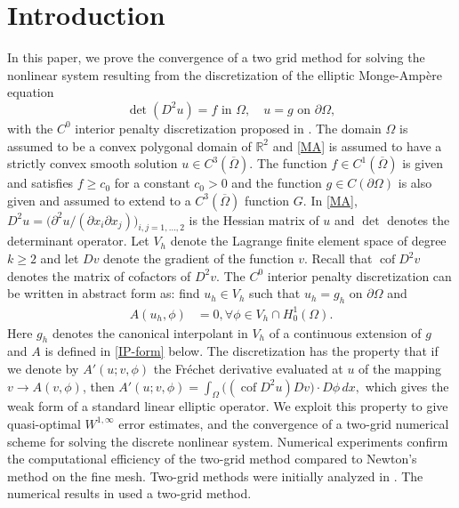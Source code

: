 \documentclass[12pt]{amsart}
\numberwithin{equation}{section}
\newcommand{\ud}{\,d}
\newcommand{\R}{\mathbb{R}}
\newcommand\cof{\operatorname{cof}}
\newcommand{\tir}[1]{\ensuremath{\overline {#1}}}
\begin{document}
\section{Introduction}
In this paper, we prove the convergence of a two grid method for solving the nonlinear system resulting from the discretization of the elliptic  Monge-Amp\`ere equation 
\begin{equation}
\det (D^2 u) = f \text{ in } \Omega, \quad u=g \text{ on } \partial \Omega,
\label{MA}
\end{equation}
with the  $C^0$ interior penalty discretization proposed in \cite{Brenner2010b}. The domain $\Omega$ is assumed to be a convex polygonal domain of $\R^2$ and \eqref{MA} is assumed to have a strictly convex smooth solution $u \in C^3(\tir{\Omega})$. The function $f \in C^1(\tir{\Omega})$ is given and satisfies $f \geq c_0$ for a constant $c_0 >0$  and the function $g\in C(\partial \Omega)$ is also given and
assumed to extend to a $C^3(\tir{\Omega})$ function $G$. In \eqref{MA}, $D^2 u=\big( \partial^2 u/(\partial x_i \partial x_j)\big)_{i,j=1,\ldots, 2} $ is the Hessian matrix of $u$ and $\det$ denotes the determinant operator. Let $V_h$ denote the Lagrange finite element space of degree $k \geq 2$ and let $D v$ denote the gradient of the function $v$. Recall that $\cof D^2 v$ denotes the matrix of cofactors of $D^2 v$. The $C^0$ interior penalty discretization can be written in abstract form as: find $u_h \in V_h$ such that $u_h=g_h$ on $\partial \Omega$ and
\begin{align} \label{IP-abstract}
A(u_h,\phi) & = 0, \forall \phi \in V_h \cap H_0^1(\Omega).
\end{align}
Here $g_h$ denotes the canonical interpolant in $V_h$ of a continuous extension of $g$  and $A$ is defined in \eqref{IP-form} below. The discretization has the property that if we denote by $A'(u;v, \phi)$ the Fr\'echet derivative evaluated at $u$ of the mapping $v \to A(v,\phi)$, then 
$A'(u;v,\phi)= \int_{\Omega} \big( (\cof  D^2 u) D v \big) \cdot D \phi \ud x,$ which gives the weak form of a standard linear elliptic operator. We exploit this property to give quasi-optimal $W^{1,\infty}$ error estimates, and the convergence of a two-grid numerical scheme for solving the discrete nonlinear system. Numerical experiments confirm the computational efficiency of the two-grid method compared to Newton's method on the fine mesh. %
Two-grid methods were initially analyzed in \cite{Xu1996}. The numerical results in \cite{Neilan2013} used a two-grid method.
\end{document}
